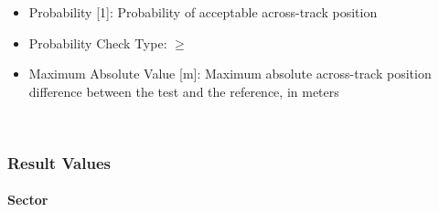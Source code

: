 \begin{itemize}  
\item Probability [1]: Probability of acceptable across-track position
\item Probability Check Type: $\geq$
\item Maximum Absolute Value [m]: Maximum absolute across-track position difference between the test and the reference, in meters
\end{itemize}
\ \\

\subsubsection{Result Values}

\paragraph{Sector}

